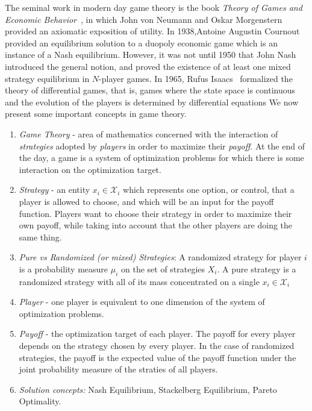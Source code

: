 The seminal work in modern day game theory is the book \textit{Theory of Games and Economic Behavior}~\cite{von1947theory}, in which John von Neumann and Oskar Morgenstern provided an axiomatic exposition of utility. In 1938,Antoine Augustin Cournout~\cite{cournout1838researches} provided an equilibrium solution to a duopoly economic game which is an instance of a Nash equilibrium. 
However, it was not until 1950 that John Nash~\cite{nash1950equilibrium} introduced the general notion, and proved the existence of at least one mixed strategy equilibrium in $N$-player games.
In 1965, Rufus Isaacs~\cite{isaacs1999differential}  formalized the theory of differential games, that is, games where the state space is continuous and the evolution of the players is determined by differential equations
We now present some important concepts in game theory.
\begin{enumerate}
    \item \textit{Game Theory} - area of mathematics concerned with the interaction of \textit{strategies} adopted by \textit{players} in order to maximize their \textit{payoff}. At the end of the day, a game is a system of optimization problems for which there is some interaction on the optimization target.
    \item \textit{Strategy} - an entity $x_i \in \mathcal{X}_i$ which represents one option, or control, that a player is allowed to choose, and which will be an input for the payoff function. Players want to choose their strategy in order to maximize their own payoff, while taking into account that the other players are doing the same thing.
    \item \textit{Pure vs Randomized (or mixed) Strategies}: A randomized strategy for player $i$ is a probability measure $\mu_i$ on the set of strategies $X_i$. A pure strategy is a randomized strategy with all of its mass concentrated on a single $x_i \in \mathcal{X}_i$%
    \item \textit{Player} - one player is equivalent to one dimension of the system of optimization problems.
    \item \textit{Payoff} - the optimization target of each player. The payoff for every player depends on the strategy chosen by every player. In the case of randomized strategies, the payoff is the expected value of the payoff function under the joint probability measure of the straties of all players.
    \item \textit{Solution concepts:} Nash Equilibrium, Stackelberg Equilibrium, Pareto Optimality.
        

\end{enumerate}
